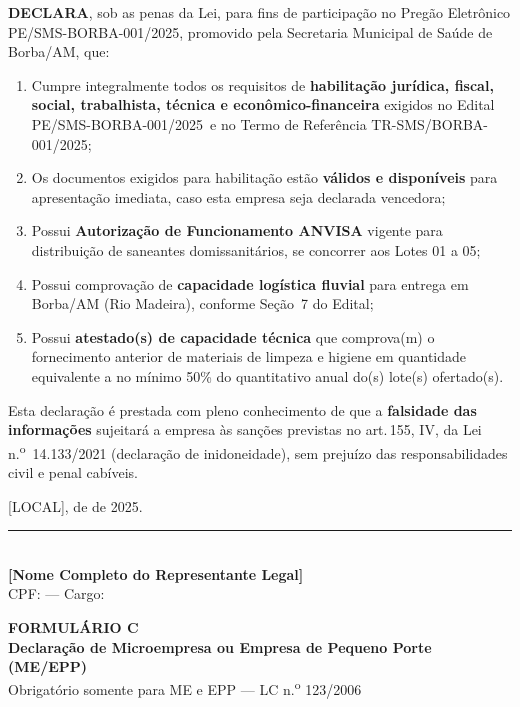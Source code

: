 \documentclass[12pt,a4paper]{article}
\newcommand{\formulario}[3]{%
  \clearpage
  \begin{tcolorbox}[enhanced,colback=navy,colframe=navy,arc=6pt,
    left=14pt,right=14pt,top=10pt,bottom=10pt]
    \color{white}
    {\large\bfseries FORMULÁRIO #1}\\[4pt]
    {\Large\bfseries #2}\\[4pt]
    {\small\color{ltblue} #3}
  \end{tcolorbox}
  \vspace{0.3cm}}
\newcommand{\art}[1]{art.\,#1}
\newcommand{\blank}[1]{\underline{\hspace{#1}}}
\newcommand{\editalRef}{PE/SMS-BORBA-001/2025}
\newcommand{\exercicio}{2025}
\newcommand{\sms}{Secretaria Municipal de Saúde de Borba/AM}
\begin{document}
\bigskip
\noindent\textbf{DECLARA}, sob as penas da Lei, para fins de participação no
Pregão Eletrônico \editalRef, promovido pela \sms, que:

\begin{enumerate}
  \item Cumpre integralmente todos os requisitos de \textbf{habilitação jurídica,
    fiscal, social, trabalhista, técnica e econômico-financeira} exigidos no
    Edital \editalRef\ e no Termo de Referência TR-SMS/BORBA-001/2025;

  \item Os documentos exigidos para habilitação estão \textbf{válidos e disponíveis}
    para apresentação imediata, caso esta empresa seja declarada vencedora;

  \item Possui \textbf{Autorização de Funcionamento ANVISA} vigente para
    distribuição de saneantes domissanitários, se concorrer aos Lotes 01 a 05;

  \item Possui comprovação de \textbf{capacidade logística fluvial} para entrega
    em Borba/AM (Rio Madeira), conforme Seção~7 do Edital;

  \item Possui \textbf{atestado(s) de capacidade técnica} que comprova(m) o
    fornecimento anterior de materiais de limpeza e higiene em quantidade
    equivalente a no mínimo 50\% do quantitativo anual do(s) lote(s) ofertado(s).
\end{enumerate}

\bigskip
\noindent Esta declaração é prestada com pleno conhecimento de que a
\textbf{falsidade das informações} sujeitará a empresa às sanções previstas no
\art{155}, IV, da Lei n.\textsuperscript{o}~14.133/2021 (declaração de
inidoneidade), sem prejuízo das responsabilidades civil e penal cabíveis.

\vspace{1.2cm}
\begin{center}
  [LOCAL], \blank{0.8cm} de \blank{3cm} de \exercicio.\\[1.0cm]
  \rule{9cm}{0.5pt}\\[3pt]
  \textbf{[Nome Completo do Representante Legal]}\\
  \small CPF: \blank{3cm} --- Cargo: \blank{3cm}
\end{center}

\formulario{C}{Declaração de Microempresa ou Empresa de Pequeno Porte (ME/EPP)}{%
  Obrigatório somente para ME e EPP --- LC n.\textsuperscript{o} 123/2006}
\end{document}
